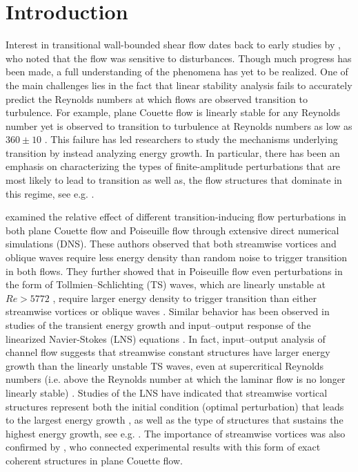 
\section{Introduction}
\label{sec:introduction}


Interest in  transitional wall-bounded shear flow dates back to early studies by \citet{reynolds1883xxix}, who noted that the flow  was sensitive to disturbances. Though much progress has been made, a full understanding of the phenomena has yet to be realized. One of the main challenges lies in the fact that linear stability analysis fails to accurately predict the Reynolds numbers at which flows are observed  transition to turbulence. For example, plane Couette flow is linearly stable for any Reynolds number \citep{romanov1973stability} yet is observed to transition to turbulence at Reynolds numbers as low as $360\pm 10$ \citep{tillmark1992experiments}. This failure has led researchers to study the mechanisms underlying transition by instead analyzing energy growth. In particular, there has been an emphasis on characterizing the types of finite-amplitude perturbations that are most likely to lead to transition as well as, the flow structures that dominate in this regime, see e.g. \citet{schmid1992new,lundbladh1994threshold,reddy1998stability,philip2007scaling,duguet2010towards,Duguet2013,farano2015hairpin}. 




\citet{reddy1998stability} examined the relative effect of different  transition-inducing flow perturbations in both plane Couette flow and Poiseuille flow through extensive direct numerical simulations (DNS). These authors observed that both streamwise vortices and oblique waves require less energy density than random noise to trigger transition \citep[figures 19 and 23]{reddy1998stability} in both flows. They further showed that in Poiseuille flow even perturbations in the form of Tollmien–Schlichting (TS) waves, which are linearly unstable at $Re>5772$ \citep{orszag1971accurate},  require larger energy density to trigger transition than either streamwise vortices or oblique waves \citep[figure 19]{reddy1998stability}. Similar behavior has been observed in studies of the transient energy growth and input--output response of the linearized Navier-Stokes (LNS) equations \citep{reddy1993energy,Jovanovic2005}. In fact, input--output analysis of channel flow suggests that streamwise constant structures have larger   energy growth than the linearly unstable TS waves, even at supercritical Reynolds numbers (i.e. above the Reynolds number at which the laminar flow is no longer linearly stable) \citep{jovanovic2004unstable,jovanovic2004modeling}. Studies of the LNS have indicated that streamwise vortical structures represent both the initial condition (optimal perturbation) that leads to the largest energy growth \citep{gustavsson1991energy,butler1992three,reddy1993energy,schmid2012stability}, as well as the type of structures that sustains the highest energy growth, see e.g. \citep{Farrell1993,Bamieh2001, Jovanovic2005}. The importance of streamwise vortices was also confirmed by \citet{bottin1998experimental}, who connected experimental results with this form of exact coherent structures in plane Couette flow.  


